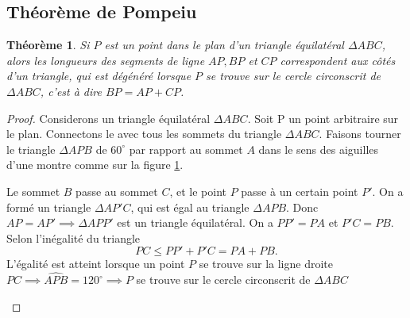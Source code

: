 \documentclass[10pt,a4paper]{article}%
\theoremstyle{theorem}
\newtheorem{theorem}{Théorème}
\theoremstyle{definition}
\begin{document}
			\subsection{Théorème de Pompeiu}\label{pomp}
				\begin{theorem}
					Si $P$ est un point dans le plan d'un triangle équilatéral $\Delta ABC$, alors les longueurs des segments de ligne $AP, BP$ et $CP$ correspondent aux côtés d'un triangle, qui est dégénéré lorsque $P$ se trouve sur le cercle circonscrit de $\Delta ABC$, c'est à dire $BP=AP+CP$.
					
				\end{theorem}
			    	\begin{proof}
			    		Considerons un triangle équilatéral $\Delta ABC$. Soit P un point arbitraire sur le plan. Connectons le avec tous les sommets du triangle $\Delta ABC$. Faisons tourner le triangle $\Delta APB$ de $60^\circ$ par rapport au sommet $A$ dans le sens des aiguilles d'une montre comme sur la figure \ref{ris1.figure}.
			    		
			    		Le sommet $B$ passe au sommet $C$, et le point $P$ passe à un certain point $P'$. On a formé un triangle $\Delta AP'C$, qui est égal au triangle $\Delta APB$. Donc $AP=AP' \implies \Delta APP'$ est un triangle équilatéral. On a $PP'=PA$ et $P'C=PB$. Selon l'inégalité du triangle 
			    		\[PC\leq PP'+P'C=PA+PB.\]
			    		L'égalité est atteint lorsque un point $P$ se trouve sur la ligne droite $PC \implies \widehat{APB}=120^\circ \implies P$ se trouve sur le cercle circonscrit de $\Delta ABC$
			    		
			    		\begin{figure}[h]
			    			    		
			    		\begin{center}
			    		\end{center}
		    			\caption{}\label{ris1.figure}
		    			\end{figure}
			    		
			   		\end{proof}
\end{document}
